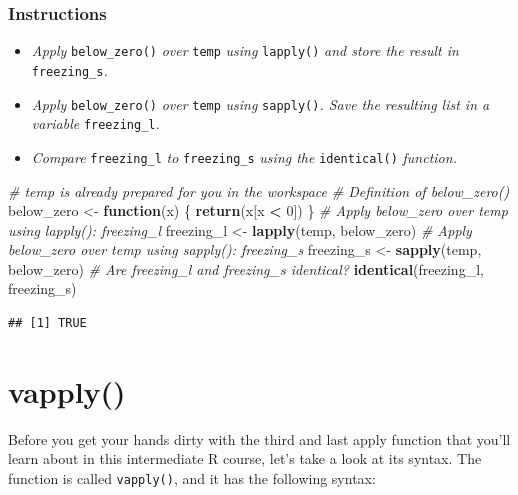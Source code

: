 \documentclass[
]{book}
\newenvironment{Shaded}{\begin{snugshade}}{\end{snugshade}}
\newcommand{\CommentTok}[1]{\textcolor[rgb]{0.56,0.35,0.01}{\textit{#1}}}
\newcommand{\ControlFlowTok}[1]{\textcolor[rgb]{0.13,0.29,0.53}{\textbf{#1}}}
\newcommand{\DecValTok}[1]{\textcolor[rgb]{0.00,0.00,0.81}{#1}}
\newcommand{\KeywordTok}[1]{\textcolor[rgb]{0.13,0.29,0.53}{\textbf{#1}}}
\newcommand{\NormalTok}[1]{#1}
\newcommand{\OperatorTok}[1]{\textcolor[rgb]{0.81,0.36,0.00}{\textbf{#1}}}
\newcommand{\StringTok}[1]{\textcolor[rgb]{0.31,0.60,0.02}{#1}}
\providecommand{\tightlist}{%
  \setlength{\itemsep}{0pt}\setlength{\parskip}{0pt}}
\begin{document}
\hypertarget{instructions}{%
\subsubsection{Instructions}\label{instructions}}

\begin{itemize}
\tightlist
\item
  \emph{Apply} \texttt{below\_zero()} \emph{over} \texttt{temp} \emph{using} \texttt{lapply()} \emph{and store the result in} \texttt{freezing\_s}\emph{.}
\item
  \emph{Apply} \texttt{below\_zero()} \emph{over} \texttt{temp} \emph{using} \texttt{sapply()}\emph{. Save the resulting list in a variable} \texttt{freezing\_l}\emph{.}
\item
  \emph{Compare} \texttt{freezing\_l} \emph{to} \texttt{freezing\_s} \emph{using the} \texttt{identical()} \emph{function.}
\end{itemize}

\begin{Shaded}
\begin{Highlighting}[]
\CommentTok{# temp is already prepared for you in the workspace}
\CommentTok{# Definition of below_zero()}
\NormalTok{below_zero <-}\StringTok{ }\ControlFlowTok{function}\NormalTok{(x) \{}
  \KeywordTok{return}\NormalTok{(x[x }\OperatorTok{<}\StringTok{ }\DecValTok{0}\NormalTok{])}
\NormalTok{\}}
\CommentTok{# Apply below_zero over temp using lapply(): freezing_l}
\NormalTok{freezing_l <-}\StringTok{ }\KeywordTok{lapply}\NormalTok{(temp, below_zero)}
\CommentTok{# Apply below_zero over temp using sapply(): freezing_s}
\NormalTok{freezing_s <-}\StringTok{ }\KeywordTok{sapply}\NormalTok{(temp, below_zero)}
\CommentTok{# Are freezing_l and freezing_s identical?}
\KeywordTok{identical}\NormalTok{(freezing_l, freezing_s)}
\end{Highlighting}
\end{Shaded}

\begin{verbatim}
## [1] TRUE
\end{verbatim}

\hypertarget{vapply}{%
\section{vapply()}\label{vapply}}

Before you get your hands dirty with the third and last apply function that you'll learn about in this intermediate R course, let's take a look at its syntax. The function is called \texttt{vapply()}, and it has the following syntax:
\end{document}
